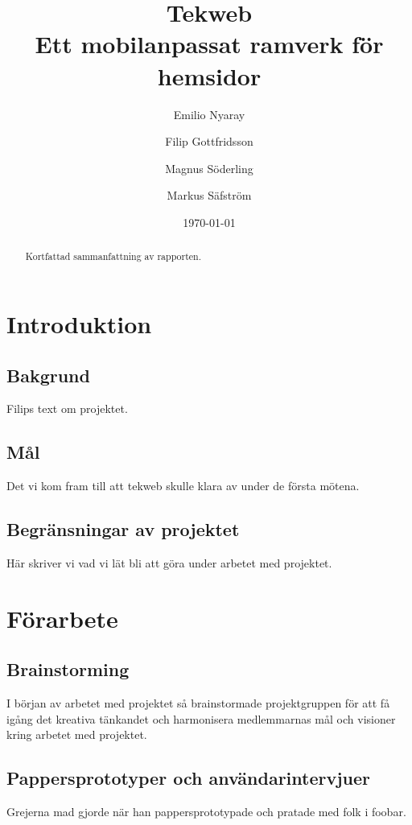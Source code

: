 \documentclass[12pt,a4paper]{report}
\title{Tekweb \\ \large{Ett mobilanpassat ramverk för hemsidor}}
\author{Emilio Nyaray      \and
        Filip Gottfridsson \and
        Magnus Söderling   \and
        Markus Säfström
}
\date{\today}
\begin{document}
\maketitle

\begin{abstract}
Kortfattad sammanfattning av rapporten.
\end{abstract}

\tableofcontents
\newpage

\chapter{Introduktion}
\section{Bakgrund}
Filips text om projektet.

\section{Mål}
Det vi kom fram till att tekweb skulle klara av under de första mötena.

\section{Begränsningar av projektet}
Här skriver vi vad vi lät bli att göra under arbetet med projektet.

\chapter{Förarbete}
\section{Brainstorming}
I början av arbetet med projektet så brainstormade projektgruppen för
att få igång det kreativa tänkandet och harmonisera medlemmarnas mål och
visioner kring arbetet med projektet.



\section{Pappersprototyper och användarintervjuer}
Grejerna mad gjorde när han pappersprototypade och pratade med folk i
foobar.
\end{document}
